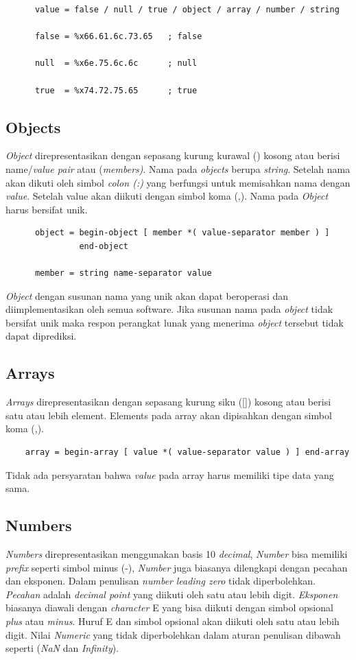\begin{lstlisting}
      value = false / null / true / object / array / number / string

      false = %x66.61.6c.73.65   ; false

      null  = %x6e.75.6c.6c      ; null

      true  = %x74.72.75.65      ; true
\end{lstlisting}

\subsection{Objects}
\textit{Object} direpresentasikan dengan sepasang kurung kurawal ({}) kosong atau berisi name/\textit{value pair} atau (\textit{members)}. Nama pada \textit{objects} berupa \textit{string}. Setelah nama akan dikuti oleh simbol \textit{colon (:)} yang berfungsi untuk memisahkan nama dengan \textit{value}. Setelah value akan diikuti dengan simbol koma (,). Nama pada \textit{Object} harus bersifat unik.

\begin{lstlisting}
      object = begin-object [ member *( value-separator member ) ]
               end-object

      member = string name-separator value
\end{lstlisting}
\textit{Object} dengan susunan nama yang unik akan dapat beroperasi dan diimplementasikan oleh semua software. Jika susunan nama pada \textit{object} tidak bersifat unik maka respon perangkat lunak yang menerima \textit{object} tersebut tidak dapat diprediksi.

\subsection{Arrays}
\textit{Arrays} direpresentasikan dengan sepasang kurung siku ([]) kosong atau berisi satu atau lebih element. Elements pada array akan dipisahkan dengan simbol koma (,).

\begin{lstlisting}
    array = begin-array [ value *( value-separator value ) ] end-array
\end{lstlisting}
Tidak ada persyaratan bahwa \textit{value} pada array harus memiliki tipe data yang sama.

\subsection{Numbers}
\textit{Numbers} direpresentasikan menggunakan basis 10 \textit{decimal}, \textit{Number} bisa memiliki \textit{prefix} seperti simbol minus (-), \textit{Number} juga biasanya dilengkapi dengan pecahan dan eksponen. Dalam penulisan \textit{number} \textit{leading zero} tidak diperbolehkan. \textit{Pecahan} adalah \textit{decimal point} yang diikuti oleh satu atau lebih digit. \textit{Eksponen} biasanya diawali dengan \textit{character} E yang bisa diikuti dengan simbol opsional \textit{plus} atau \textit{minus}. Huruf E dan simbol opsional akan diikuti oleh satu atau lebih digit.
Nilai \textit{Numeric} yang tidak diperbolehkan dalam aturan penulisan dibawah seperti (\textit{NaN} dan \textit{Infinity}).

